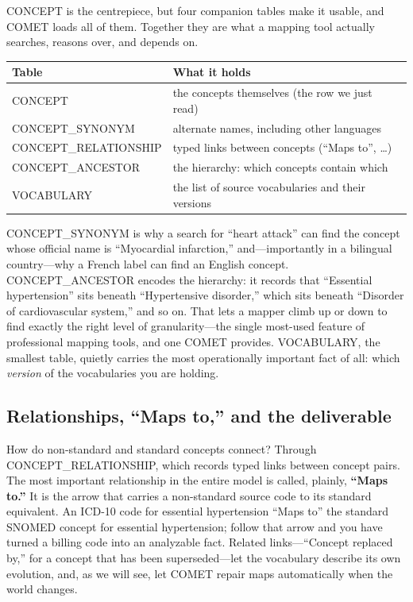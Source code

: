 \documentclass[12pt,openany]{book}
\newcommand{\code}[1]{{\ttfamily\small #1}}
\begin{document}
\code{CONCEPT} is the centrepiece, but four companion tables make it usable, and COMET loads all of
them. Together they are what a mapping tool actually searches, reasons over, and depends on.

\begin{center}
\small\sffamily
\begin{tabular}{@{}ll@{}}
\toprule
\textbf{Table} & \textbf{What it holds} \\
\midrule
\code{CONCEPT} & the concepts themselves (the row we just read) \\
\code{CONCEPT\_SYNONYM} & alternate names, including other languages \\
\code{CONCEPT\_RELATIONSHIP} & typed links between concepts (``Maps to'', \ldots) \\
\code{CONCEPT\_ANCESTOR} & the hierarchy: which concepts contain which \\
\code{VOCABULARY} & the list of source vocabularies and their versions \\
\bottomrule
\end{tabular}
\end{center}

\code{CONCEPT\_SYNONYM} is why a search for ``heart attack'' can find the concept whose official name
is ``Myocardial infarction,'' and---importantly in a bilingual country---why a French label can find
an English concept. \code{CONCEPT\_ANCESTOR} encodes the hierarchy: it records that ``Essential
hypertension'' sits beneath ``Hypertensive disorder,'' which sits beneath ``Disorder of cardiovascular
system,'' and so on. That lets a mapper climb up or down to find exactly the right level of
granularity---the single most-used feature of professional mapping tools, and one COMET provides.
\code{VOCABULARY}, the smallest table, quietly carries the most operationally important fact of all:
which \emph{version} of the vocabularies you are holding.

\subsection{Relationships, ``Maps to,'' and the deliverable}

How do non-standard and standard concepts connect? Through \code{CONCEPT\_RELATIONSHIP}, which records
typed links between concept pairs. The most important relationship in the entire model is called,
plainly, \textbf{``Maps to.''} It is the arrow that carries a non-standard source code to its standard
equivalent. An ICD-10 code for essential hypertension ``Maps to'' the standard SNOMED concept for
essential hypertension; follow that arrow and you have turned a billing code into an analyzable fact.
Related links---``Concept replaced by,'' for a concept that has been superseded---let the vocabulary
describe its own evolution, and, as we will see, let COMET repair maps automatically when the world
changes.
\end{document}
